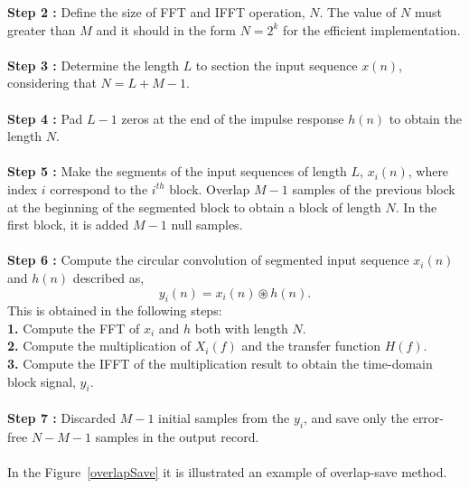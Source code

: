 \begin{refsection}
\textbf{ Step 2 :} Define the size of FFT and IFFT operation, $N$. The value of $N$ must greater than $M$ and it should in the form $N = 2^k$ for the efficient implementation.\\ \\
\textbf{ Step 3 :} Determine the length $L$ to section the input sequence $x(n)$, considering that $N=L+M-1$.\\ \\   
\textbf{ Step 4 :} Pad $L-1$ zeros at the end of the impulse response $h(n)$ to obtain the length $N$.\\ \\
\textbf{ Step 5 :} Make the segments of the input sequences of length $L$, $x_i(n)$, where index $i$ correspond to the $i^{th}$ block. Overlap $M-1$ samples of the previous block at the beginning of the segmented block to obtain a block of length $N$. In the first block, it is added $M-1$ null samples.\\ \\
\textbf{ Step 6 :} Compute the circular convolution of segmented input sequence $x_i(n)$ and $h(n)$ described as,
\begin{equation}
y_i(n)= x_i(n) \circledast h(n).
\label{genFIR}
\end{equation}
This is obtained in the following steps:\\
\textbf{1. } Compute the FFT of $x_i$ and $h$ both with length $N$.\\
\textbf{2. }Compute the multiplication of $X_i(f)$ and the transfer function $H(f)$.\\
\textbf{3. }Compute the IFFT of the multiplication result to obtain the time-domain block signal, $y_i$.\\ \\
\textbf{ Step 7 :} Discarded $M-1$ initial samples from the $y_i$, and save only the error-free $N-M-1$ samples in the output record.\\ \\
In the Figure~\ref{overlapSave} it is illustrated an example of overlap-save method.
\begin{figure}[h]
	\centering

\end{figure}
\end{refsection}
